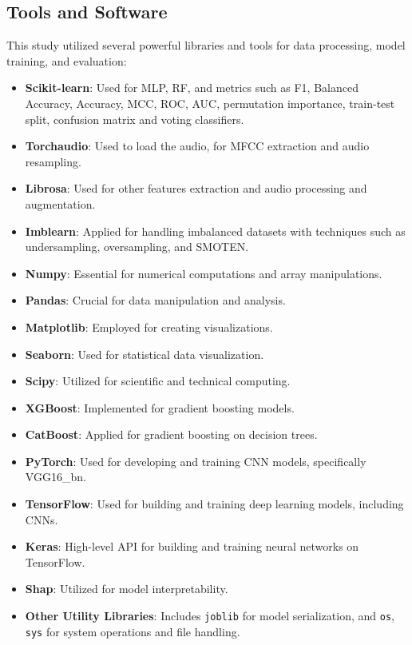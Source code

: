 \subsection{Tools and Software}

This study utilized several powerful libraries and tools for data processing, model training, and evaluation:

\begin{itemize}[leftmargin=*, topsep=0pt, itemsep=0pt]
    \item \textbf{Scikit-learn}: Used for MLP, RF, and metrics such as F1, Balanced Accuracy, Accuracy, MCC, ROC, AUC, permutation importance, train-test split, confusion matrix and voting classifiers.
    \item \textbf{Torchaudio}: Used to load the audio, for MFCC extraction and audio resampling.
    \item \textbf{Librosa}: Used for other features extraction and audio processing and augmentation.
    \item \textbf{Imblearn}: Applied for handling imbalanced datasets with techniques such as undersampling, oversampling, and SMOTEN.
    \item \textbf{Numpy}: Essential for numerical computations and array manipulations.
    \item \textbf{Pandas}: Crucial for data manipulation and analysis.
    \item \textbf{Matplotlib}: Employed for creating visualizations.
    \item \textbf{Seaborn}: Used for statistical data visualization.
    \item \textbf{Scipy}: Utilized for scientific and technical computing.
    \item \textbf{XGBoost}: Implemented for gradient boosting models.
    \item \textbf{CatBoost}: Applied for gradient boosting on decision trees.
    \item \textbf{PyTorch}: Used for developing and training CNN models, specifically VGG16\_bn.
    \item \textbf{TensorFlow}: Used for building and training deep learning models, including CNNs.
    \item \textbf{Keras}: High-level API for building and training neural networks on TensorFlow.
    \item \textbf{Shap}: Utilized for model interpretability.
    \item \textbf{Other Utility Libraries}: Includes \texttt{joblib} for model serialization, and \texttt{os}, \texttt{sys} for system operations and file handling.
\end{itemize}